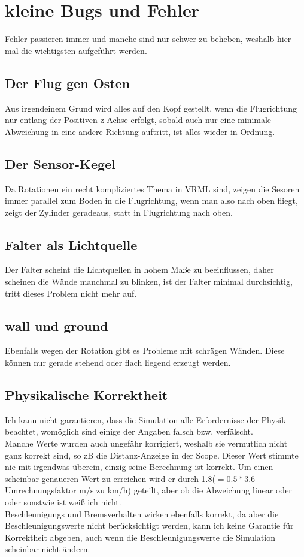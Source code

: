 \documentclass[titlepage, a4paper, ngerman]{article}
\begin{document}
\section{kleine Bugs und Fehler}
Fehler passieren immer und manche sind nur schwer zu beheben, weshalb hier mal die wichtigsten aufgeführt werden.
\subsection{Der Flug gen Osten}
Aus irgendeinem Grund wird alles auf den Kopf gestellt, wenn die Flugrichtung nur entlang der Positiven z-Achse erfolgt, sobald auch nur eine minimale Abweichung in eine andere Richtung auftritt, ist alles wieder in Ordnung.
\subsection{Der Sensor-Kegel}
Da Rotationen ein recht kompliziertes Thema in VRML sind, zeigen die Sesoren immer parallel zum Boden in die Flugrichtung, wenn man also nach oben fliegt, zeigt der Zylinder geradeaus, statt in Flugrichtung nach oben.
\subsection{Falter als Lichtquelle}
Der Falter scheint die Lichtquellen in hohem Maße zu beeinflussen, daher scheinen die Wände manchmal zu blinken, ist der Falter minimal durchsichtig, tritt dieses Problem nicht mehr auf.
\subsection{wall und ground}
Ebenfalls wegen der Rotation gibt es Probleme mit schrägen Wänden. Diese können nur gerade stehend oder flach liegend erzeugt werden.
\subsection{Physikalische Korrektheit}
Ich kann nicht garantieren, dass die Simulation alle Erfordernisse der Physik beachtet, womöglich sind einige der Angaben falsch bzw. verfälscht.\\
Manche Werte wurden auch ungefähr korrigiert, weshalb sie vermutlich nicht ganz korrekt sind, so zB die Distanz-Anzeige in der Scope. Dieser Wert stimmte nie mit irgendwas überein, einzig seine Berechnung ist korrekt. Um einen scheinbar genaueren Wert zu erreichen wird er durch 1.8($= 0.5 * 3.6$ Umrechnungsfaktor m/s zu km/h)  geteilt, aber ob die Abweichung linear oder oder sonstwie ist weiß ich nicht.\\
Beschleunigungs und Bremsverhalten wirken ebenfalls korrekt, da aber die Beschleunigungswerte nicht berücksichtigt werden, kann ich keine Garantie für Korrektheit abgeben, auch wenn die Beschleunigungswerte die Simulation scheinbar nicht ändern.
\end{document}
